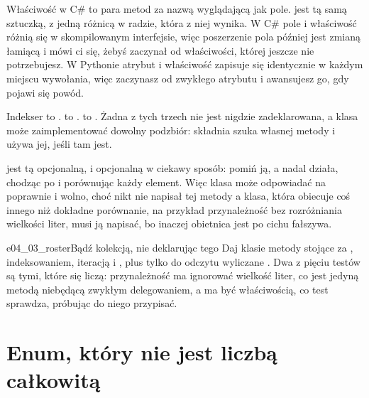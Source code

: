 Właściwość w C\# to para metod za nazwą wyglądającą jak pole.
 jest tą samą sztuczką, z jedną różnicą w radzie, która z
niej wynika. W C\# pole i właściwość różnią się w skompilowanym
interfejsie, więc poszerzenie pola później jest zmianą łamiącą i mówi ci
się, żebyś zaczynał od właściwości, której jeszcze nie potrzebujesz. W
Pythonie atrybut i właściwość zapisuje się identycznie w każdym miejscu
wywołania, więc zaczynasz od zwykłego atrybutu i awansujesz go, gdy
pojawi się powód.


\noindent
Indekser to .  to .
 to . Żadna z tych trzech nie jest
nigdzie zadeklarowana, a klasa może zaimplementować dowolny podzbiór:
składnia szuka własnej metody i używa jej, jeśli tam jest.


\begin{note}
 jest tą opcjonalną, i opcjonalną w ciekawy sposób:
pomiń ją, a  nadal działa, chodząc po  i
porównując każdy element. Więc klasa może odpowiadać na 
poprawnie i wolno, choć nikt nie napisał tej metody \dash{} a klasa, która
obiecuje coś innego niż dokładne porównanie, na przykład przynależność
bez rozróżniania wielkości liter, musi ją napisać, bo inaczej obietnica
jest po cichu fałszywa.
\end{note}

\begin{exercise}{e04_03_roster}{Bądź kolekcją, nie deklarując tego}
Daj klasie  metody stojące za , indeksowaniem,
iteracją i , plus tylko do odczytu wyliczane . Dwa z
pięciu testów są tymi, które się liczą: przynależność ma ignorować
wielkość liter, co jest jedyną metodą niebędącą zwykłym delegowaniem, a
 ma być właściwością, co test sprawdza, próbując do niego
przypisać.
\end{exercise}

\section{Enum, który nie jest liczbą całkowitą}
\label{sec:ch04-enums}

